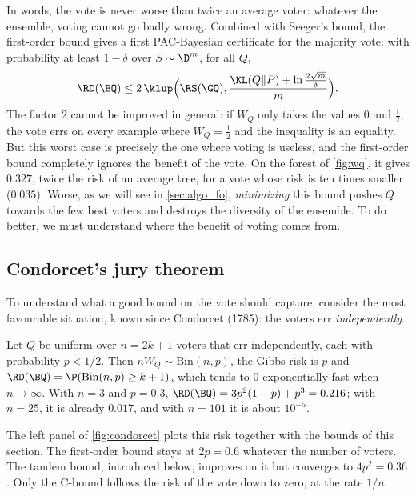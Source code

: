 In words, the vote is never worse than twice an average voter: whatever the
ensemble, voting cannot go badly wrong. Combined with Seeger's bound, the
first-order bound gives a first PAC-Bayesian
certificate for the majority vote: with probability at least $1-\delta$ over
$S\sim\D^m$, for all $Q$,
\begin{equation}\label{eq:fo_pb}
\RD(\BQ)\leq2\,\klup\Big(\RS(\GQ),\frac{\KL(Q\|P)+\ln\frac{2\sqrt m}{\delta}}{m}\Big).
\end{equation}
The factor $2$ cannot be improved in general: if $W_Q$ only takes the values
$0$ and $\frac12$, the vote errs on every example where $W_Q=\frac12$ and the
inequality is an equality. But this worst case is precisely the one where voting
is useless, and the first-order bound completely ignores the benefit of the
vote. On the forest of \cref{fig:wq}, it gives $0.327$, twice the risk of an
average tree, for a vote whose risk is ten times smaller ($0.035$). Worse, as
we will see in \cref{sec:algo_fo}, \emph{minimizing} this bound pushes $Q$
towards the few best voters and destroys the diversity of the ensemble. To do
better, we must understand where the benefit of voting comes from.

\subsection{Condorcet's jury theorem}

To understand what a good bound on the vote should capture, consider the
most favourable situation, known since Condorcet (1785): the voters err
\emph{independently}.

\begin{example}
Let $Q$ be uniform over $n=2k+1$ voters that err independently, each with
probability $p<1/2$. Then $nW_Q\sim\mathrm{Bin}(n,p)$, the Gibbs risk is $p$ and
$\RD(\BQ)=\P(\mathrm{Bin}(n,p)\geq k+1)$, which tends to $0$ exponentially fast
when $n\to\infty$. With $n=3$ and $p=0.3$, $\RD(\BQ)=3p^2(1-p)+p^3=0.216$; with
$n=25$, it is already $0.017$, and with $n=101$ it is about $10^{-5}$.
\end{example}

The left panel of \cref{fig:condorcet} plots this risk together with the bounds
of this section. The first-order bound stays at $2p=0.6$ whatever the number of
voters. The tandem bound, introduced below, improves on it but converges to
$4p^2=0.36$. Only the C-bound follows the risk of the vote down to zero, at the
rate $1/n$.

